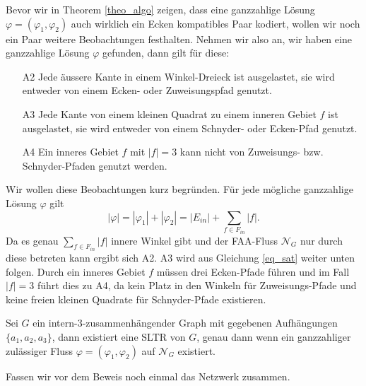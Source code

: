 Bevor wir in Theorem \ref{theo_algo} zeigen, dass eine ganzzahlige Lösung $\varphi=(\varphi_1,\varphi_2)$ auch wirklich ein Ecken kompatibles Paar kodiert, wollen wir noch ein Paar weitere Beobachtungen festhalten. Nehmen wir also an, wir haben eine ganzzahlige Lösung $\varphi$ gefunden, dann gilt für diese:
\begin{itemize}
\item [A2] Jede äussere Kante in einem Winkel-Dreieck ist ausgelastet, sie wird entweder von einem Ecken- oder Zuweisungspfad genutzt.
\item [A3] Jede Kante von einem kleinen Quadrat zu einem inneren Gebiet $f$ ist ausgelastet, sie wird entweder von einem Schnyder- oder Ecken-Pfad genutzt.
\item [A4] Ein inneres Gebiet $f$ mit $|f|=3$ kann nicht von Zuweisungs- bzw. Schnyder-Pfaden genutzt werden.
\end{itemize}

Wir wollen diese Beobachtungen kurz begründen. Für jede mögliche ganzzahlige Lösung $\varphi$ gilt $$|\varphi|=|\varphi_1|+|\varphi_2| = |E_{in}| + \sum_{f \in F_{in}} |f|.$$
Da es genau $\sum_{f \in F_{in}} |f|$ innere Winkel gibt und der FAA-Fluss $\mathcal{N}_G$ nur durch diese betreten kann ergibt sich A2. A3 wird aus Gleichung \ref{eq_sat} weiter unten folgen. Durch ein inneres Gebiet $f$ müssen drei Ecken-Pfade führen und im Fall $|f|=3$ führt dies zu A4, da kein Platz in den Winkeln für Zuweisungs-Pfade und keine freien kleinen Quadrate für Schnyder-Pfade existieren.

\begin{theorem}\label{theo_algo}
Sei $G$ ein intern-3-zusammenhängender Graph mit gegebenen Aufhängungen $\{a_1,a_2,a_3\}$, dann existiert eine SLTR von $G$, genau dann wenn ein ganzzahliger zulässiger Fluss $\varphi=(\varphi_1,\varphi_2)$ auf $\mathcal{N}_G$ existiert.
\end{theorem}

Fassen wir vor dem Beweis noch einmal das Netzwerk zusammen.

